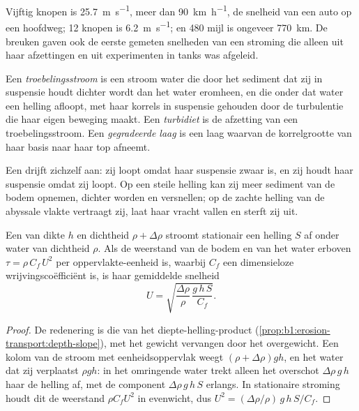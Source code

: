 Vijftig knopen is \qty{25.7}{m.s^{-1}}, meer dan \qty{90}{km.h^{-1}}, de snelheid van een auto op een hoofdweg; 12 knopen is \qty{6.2}{m.s^{-1}}; en 480 mijl is ongeveer \qty{770}{km}. De breuken gaven ook de eerste gemeten snelheden van een stroming die alleen uit haar afzettingen en uit experimenten in tanks was afgeleid.

\begin{definition}\label{def:b1:clastic-sediments:turbidite}
Een \emph{troebelingsstroom} is een stroom water die door het sediment dat zij in suspensie houdt dichter wordt dan het water eromheen, en die onder dat water een helling afloopt, met haar korrels in suspensie gehouden door de turbulentie die haar eigen beweging maakt. Een \emph{turbidiet} is de afzetting van een troebelingsstroom. Een \emph{gegradeerde laag} is een laag waarvan de korrelgrootte van haar basis naar haar top afneemt.
\end{definition}

Een  drijft zichzelf aan: zij loopt omdat haar suspensie zwaar is, en zij houdt haar suspensie omdat zij loopt. Op een steile helling kan zij meer sediment van de bodem opnemen, dichter worden en versnellen; op de zachte helling van de abyssale vlakte vertraagt zij, laat haar vracht vallen en sterft zij uit.

\begin{proposition}\label{prop:b1:clastic-sediments:turbidity}
Een  van dikte $h$ en dichtheid $\rho + \Delta\rho$ stroomt stationair een helling $S$ af onder water van dichtheid $\rho$. Als de weerstand van de bodem en van het water erboven $\tau = \rho\,C_f\,U^2$ per oppervlakte-eenheid is, waarbij $C_f$ een dimensieloze wrijvingscoëfficiënt is, is haar gemiddelde snelheid
\[
  U = \sqrt{\frac{\Delta\rho}{\rho}\,\frac{g\,h\,S}{C_f}} .
\]
\end{proposition}

\begin{proof}
De redenering is die van het diepte-helling-product (\cref{prop:b1:erosion-transport:depth-slope}), met het gewicht vervangen door het overgewicht. Een kolom van de stroom met eenheidsoppervlak weegt $(\rho +
\Delta\rho) g h$, en het water dat zij verplaatst $\rho g h$: in het omringende water trekt alleen het overschot $\Delta\rho\,g\,h$ haar de helling af, met de component $\Delta\rho\,g\,h\,S$ erlangs. In stationaire stroming houdt dit de weerstand $\rho C_f U^2$ in evenwicht, dus $U^2 = (\Delta\rho/\rho)\,g\,h\,S/C_f$.
\end{proof}

